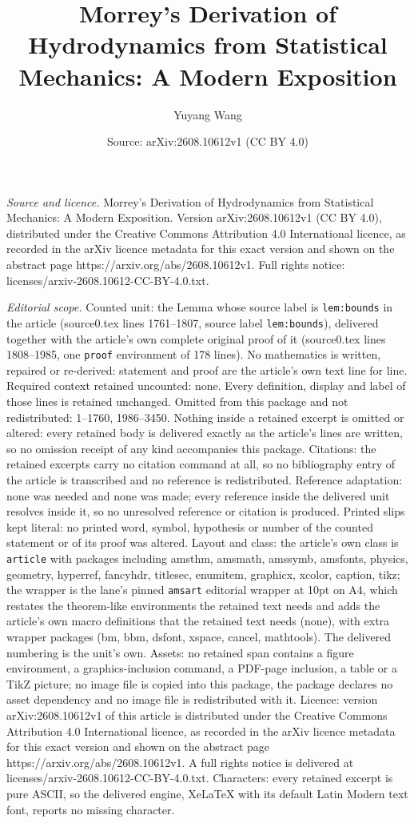 \documentclass[10pt,a4paper]{amsart}
\title[Morrey's Derivation of Hydrodynamics from Statistical Mechan]{Morrey's Derivation of Hydrodynamics from Statistical Mechanics: A Modern Exposition}
\author{Yuyang Wang}
\date{Source: arXiv:2608.10612v1 (CC BY 4.0)}
\begin{document}
\maketitle

\noindent\emph{Source and licence.} Morrey's Derivation of Hydrodynamics from Statistical Mechanics: A Modern Exposition. Version arXiv:2608.10612v1 (CC BY 4.0), distributed under the Creative Commons Attribution 4.0 International licence, as recorded in the arXiv licence metadata for this exact version and shown on the abstract page https://arxiv.org/abs/2608.10612v1. Full rights notice: licenses/arxiv-2608.10612-CC-BY-4.0.txt.\par\smallskip

\noindent\textit{Editorial scope.} Counted unit: the Lemma whose source label is \texttt{lem:bounds} in the article (source0.tex lines 1761--1807, source label \texttt{lem:bounds}), delivered together with the article's own complete original proof of it (source0.tex lines 1808--1985, one \texttt{proof} environment of 178 lines). No mathematics is written, repaired or re-derived: statement and proof are the article's own text line for line. Required context retained uncounted: none. Every definition, display and label of those lines is retained unchanged. Omitted from this package and not redistributed: 1--1760, 1986--3450. Nothing inside a retained excerpt is omitted or altered: every retained body is delivered exactly as the article's lines are written, so no omission receipt of any kind accompanies this package. Citations: the retained excerpts carry no citation command at all, so no bibliography entry of the article is transcribed and no reference is redistributed. Reference adaptation: none was needed and none was made; every reference inside the delivered unit resolves inside it, so no unresolved reference or citation is produced. Printed slips kept literal: no printed word, symbol, hypothesis or number of the counted statement or of its proof was altered. Layout and class: the article's own class is \texttt{article} with packages including amsthm, amsmath, amssymb, amsfonts, physics, geometry, hyperref, fancyhdr, titlesec, enumitem, graphicx, xcolor, caption, tikz; the wrapper is the lane's pinned \texttt{amsart} editorial wrapper at 10pt on A4, which restates the theorem-like environments the retained text needs and adds the article's own macro definitions that the retained text needs (none), with extra wrapper packages (bm, bbm, dsfont, xspace, cancel, mathtools). The delivered numbering is the unit's own. Assets: no retained span contains a figure environment, a graphics-inclusion command, a PDF-page inclusion, a table or a TikZ picture; no image file is copied into this package, the package declares no asset dependency and no image file is redistributed with it. Licence: version arXiv:2608.10612v1 of this article is distributed under the Creative Commons Attribution 4.0 International licence, as recorded in the arXiv licence metadata for this exact version and shown on the abstract page https://arxiv.org/abs/2608.10612v1. A full rights notice is delivered at licenses/arxiv-2608.10612-CC-BY-4.0.txt. Characters: every retained excerpt is pure ASCII, so the delivered engine, XeLaTeX with its default Latin Modern text font, reports no missing character.
\end{document}
